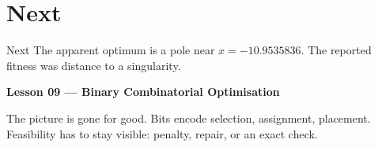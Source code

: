 \section{Next}

\begin{frame}{Next}
The apparent optimum is a pole near \(x = -10.9535836\). The reported fitness was distance to a singularity.

\vspace{0.8em}
\textbf{Lesson 09 --- Binary Combinatorial Optimisation}

The picture is gone for good. Bits encode selection, assignment, placement. Feasibility has to stay visible: penalty, repair, or an exact check.
\end{frame}

